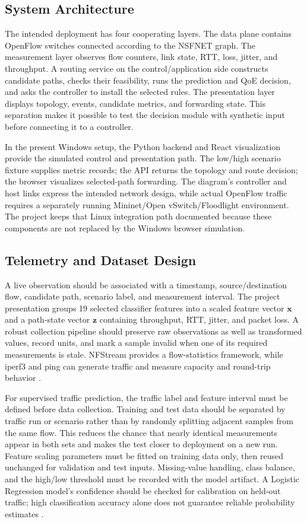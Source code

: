 \documentclass[conference]{IEEEtran}
\begin{document}
\subsection{System Architecture}
The intended deployment has four cooperating layers. The data plane contains OpenFlow switches connected according to the NSFNET graph. The measurement layer observes flow counters, link state, RTT, loss, jitter, and throughput. A routing service on the control/application side constructs candidate paths, checks their feasibility, runs the prediction and QoE decision, and asks the controller to install the selected rules. The presentation layer displays topology, events, candidate metrics, and forwarding state. This separation makes it possible to test the decision module with synthetic input before connecting it to a controller.

In the present Windows setup, the Python backend and React visualization provide the simulated control and presentation path. The low/high scenario fixture supplies metric records; the API returns the topology and route decision; the browser visualizes selected-path forwarding. The diagram's controller and host links express the intended network design, while actual OpenFlow traffic requires a separately running Mininet/Open vSwitch/Floodlight environment. The project keeps that Linux integration path documented because these components are not replaced by the Windows browser simulation.

\subsection{Telemetry and Dataset Design}
A live observation should be associated with a timestamp, source/destination flow, candidate path, scenario label, and measurement interval. The project presentation groups 19 selected classifier features into a scaled feature vector $\mathbf{x}$ and a path-state vector $\mathbf{z}$ containing throughput, RTT, jitter, and packet loss. A robust collection pipeline should preserve raw observations as well as transformed values, record units, and mark a sample invalid when one of its required measurements is stale. NFStream provides a flow-statistics framework, while iperf3 and ping can generate traffic and measure capacity and round-trip behavior \cite{aouini2022nfstream}.

For supervised traffic prediction, the traffic label and feature interval must be defined before data collection. Training and test data should be separated by traffic run or scenario rather than by randomly splitting adjacent samples from the same flow. This reduces the chance that nearly identical measurements appear in both sets and makes the test closer to deployment on a new run. Feature scaling parameters must be fitted on training data only, then reused unchanged for validation and test inputs. Missing-value handling, class balance, and the high/low threshold must be recorded with the model artifact. A Logistic Regression model's confidence should be checked for calibration on held-out traffic; high classification accuracy alone does not guarantee reliable probability estimates \cite{alpaydin2020ml}.
\end{document}
